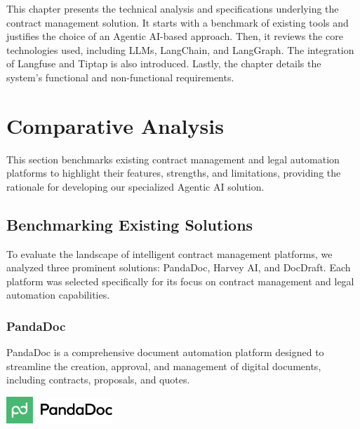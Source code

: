 This chapter presents the technical analysis and specifications underlying the contract management solution. It starts with a benchmark of existing tools and justifies the choice of an Agentic AI-based approach. Then, it reviews the core technologies used, including LLMs, LangChain, and LangGraph. The integration of Langfuse and Tiptap is also introduced. Lastly, the chapter details the system’s functional and non-functional requirements.

\newpage
{}
\hypertarget{secondchapter}{}
\section{Comparative Analysis}

This section benchmarks existing contract management and legal automation platforms to highlight their features, strengths, and limitations, providing the rationale for developing our specialized Agentic AI solution.

\subsection{Benchmarking Existing Solutions}
To evaluate the landscape of intelligent contract management platforms, we analyzed three prominent solutions: PandaDoc, Harvey AI, and DocDraft. Each platform was selected specifically for its focus on contract management and legal automation capabilities.

\subsubsection{PandaDoc}
PandaDoc is a comprehensive document automation platform designed to streamline the creation, approval, and management of digital documents, including contracts, proposals, and quotes.\mynewline

\begin{center}
    \centering
    \includegraphics[width=0.3\textwidth]{Images/PandaDoc_logo.png}
     \cite{pandadoc_logo}
    \label{fig:pandadoc_logo}
\end{center}

